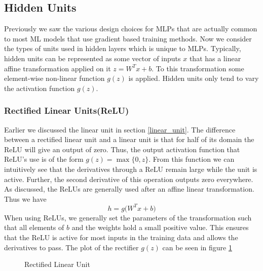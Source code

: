 \documentclass[14pt]{extarticle}
\numberwithin{equation}{section}
\begin{document}
	\subsection{Hidden Units}
	Previously we saw the various design choices for MLPs that are actually common to most ML models that use gradient based training methods. Now we consider the types of units used in hidden layers which is unique to MLPs. Typically, hidden units can be represented as some vector of inputs $x$ that has a linear affine transformation applied on it $z = W^Tx + b$. To this transformation some element-wise non-linear function $g(z)$ is applied. Hidden units only tend to vary the activation function $g(z)$.
	\subsubsection{Rectified Linear Units(ReLU)}
	Earlier we discussed the linear unit in section \ref{linear_unit}. The difference between a rectified linear unit and a linear unit is that for half of its domain the ReLU will give an output of zero. Thus, the output activation function that ReLU's use is of the form $g(z) = \max \{0,z\}$. From this function we can intuitively see that the derivatives through a ReLU remain large while the unit is active. Further, the second derivative of this operation outputs zero everywhere. As discussed, the ReLUs are generally used after an affine linear transformation. Thus we have
	\begin{equation}
	h = g\big(W^Tx + b\big)
	\end{equation}
	When using ReLUs, we generally set the parameters of the transformation such that all elements of $b$ and the weights hold a small positive value. This ensures that the ReLU is active for most inputs in the training data and allows the derivatives to pass. The plot of the rectifier $g(z)$ can be seen in figure \ref{relu}
	\begin{figure}[H]
		\centering
		\setlength{\fboxsep}{5pt}%
		\setlength{\fboxrule}{1pt}%
		\caption{Rectified Linear Unit
			\label{relu}}
	\end{figure}
\end{document}
